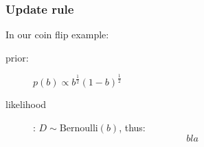 \documentclass[t]{beamer}
\begin{document}
\begin{frame}
  \frametitle{Update rule}
  In our coin flip example:
  \begin{description}
  \item[prior:] $p(b) \propto b^\frac{1}{2} (1-b)^\frac{1}{2}$
  \item[likelihood]: $D \sim \mathrm{Bernoulli}(b)$, thus:
    \begin{equation*}
      bla
    \end{equation*}
  \end{description}
\end{frame}
\end{document}
